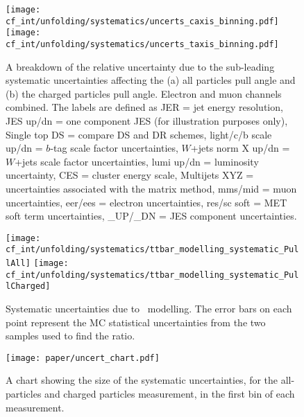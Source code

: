 \begin{figure}[htb]
  \texttt{[image: cf\_int/unfolding/systematics/uncerts\_caxis\_binning.pdf]} \\
  \texttt{[image: cf\_int/unfolding/systematics/uncerts\_taxis\_binning.pdf]} \\
  \caption{A breakdown of the relative uncertainty due to the sub-leading systematic uncertainties affecting the (a) all particles pull angle and (b) the charged particles pull angle.  Electron and muon channels combined.  The labels are defined as JER = jet energy resolution, JES up/dn = one component JES (for illustration purposes only), Single top DS = compare DS and DR schemes, light/c/b scale up/dn = $b$-tag scale factor uncertainties, $W$+jets norm X up/dn = $W$+jets scale factor uncertainties, lumi up/dn = luminosity uncertainty, CES = cluster energy scale, Multijets XYZ = uncertainties associated with the matrix method, mms/mid = muon uncertainties, eer/ees = electron uncertainties, res/sc soft = MET soft term uncertainties, \_UP/\_DN = JES component uncertainties.}
  \label{fig:color:unfolding:systs_small}
\end{figure}




\begin{figure}[htb]
  
  \texttt{[image: cf\_int/unfolding/systematics/ttbar\_modelling\_systematic\_PullAll]}
  \texttt{[image: cf\_int/unfolding/systematics/ttbar\_modelling\_systematic\_PullCharged]} \\
  \caption{Systematic uncertainties due to \ttbar\ modelling. The error bars on
    each point represent the MC statistical uncertainties from the two samples
    used to find the ratio.}
  \label{fig:color:unfolding:systs_ttbar_mod}
\end{figure}





\begin{figure}[htbp]
  \centering
    \texttt{[image: paper/uncert\_chart.pdf]}
  \caption{A chart showing the size of the systematic uncertainties, for the all-particles and charged particles measurement, in the first bin of each measurement.}
  \label{fig:color:unfolding:uncert_chart}
\end{figure}




